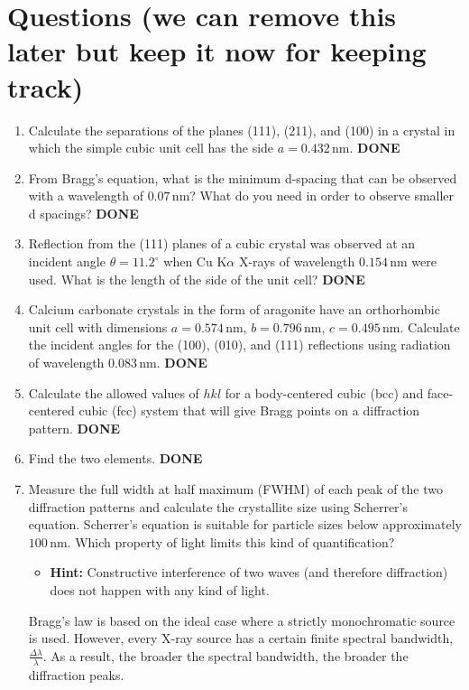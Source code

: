 \section*{Questions (we can remove this later but keep it now for keeping track)}

\begin{enumerate}
    \item Calculate the separations of the planes (111), (211), and (100) in a crystal in which the simple cubic unit cell has the side \( a = 0.432 \, \text{nm} \). \textbf{DONE}
    \item From Bragg’s equation, what is the minimum d-spacing that can be observed with a wavelength of \( 0.07 \, \text{nm} \)? What do you need in order to observe smaller d spacings? \textbf{DONE}
    \item Reflection from the (111) planes of a cubic crystal was observed at an incident angle \( \theta = 11.2^\circ \) when Cu K\(\alpha\) X-rays of wavelength \( 0.154 \, \text{nm} \) were used. What is the length of the side of the unit cell? \textbf{DONE}
    \item Calcium carbonate crystals in the form of aragonite have an orthorhombic unit cell with dimensions \( a = 0.574 \, \text{nm} \), \( b = 0.796 \, \text{nm} \), \( c = 0.495 \, \text{nm} \). Calculate the incident angles for the (100), (010), and (111) reflections using radiation of wavelength \( 0.083 \, \text{nm} \). \textbf{DONE}
    \item Calculate the allowed values of \( hkl \) for a body-centered cubic (bcc) and face-centered cubic (fcc) system that will give Bragg points on a diffraction pattern. \textbf{DONE}
    \item Find the two elements. \textbf{DONE}
    \item Measure the full width at half maximum (FWHM) of each peak of the two diffraction patterns and calculate the crystallite size using Scherrer’s equation. Scherrer’s equation is suitable for particle sizes below approximately \( 100 \, \text{nm} \). Which property of light limits this kind of quantification? 
    \begin{itemize}
        \item \textbf{Hint:} Constructive interference of two waves (and therefore diffraction) does not happen with any kind of light.
    \end{itemize}
    Bragg’s law is based on the ideal case where a strictly monochromatic source is used. However, every X-ray source has a certain finite spectral bandwidth, \( \frac{\Delta \lambda}{\lambda} \). As a result, the broader the spectral bandwidth, the broader the diffraction peaks.
    

\end{enumerate}
